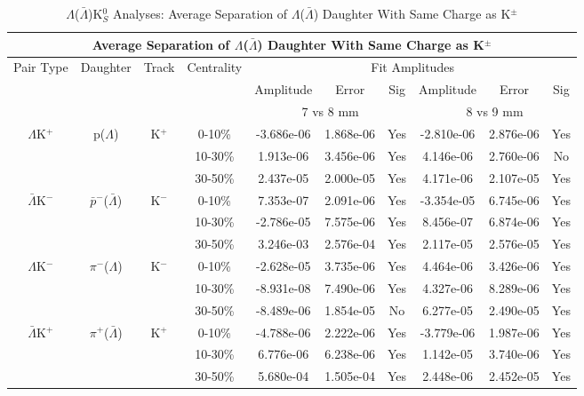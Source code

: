 \documentclass[../AnalysisNoteJBuxton.tex]{subfiles}
\begin{document}
\clearpage



\begin{table}
 \centering
 \begin{tabular}{|c|c|c|c|c|c|c||c|c|c|}
  \multicolumn{10}{c}{Average Separation of $\Lambda$($\bar{\Lambda}$) Daughter With Same Charge as K$^{\pm}$} \\
  \hline
  \multirow{3}{*}{Pair Type} & \multirow{3}{*}{Daughter} & \multirow{3}{*}{Track} & \multirow{3}{*}{Centrality} & \multicolumn{6}{c|}{Fit Amplitudes} \\
  \cline{5-10}
   & & & & Amplitude & Error & Sig & Amplitude & Error & Sig \\  
  \cline{5-10}
   & & & & \multicolumn{3}{c||}{7 vs 8 mm} & \multicolumn{3}{c|}{8 vs 9 mm} \\  
  \hline
  \multirow{3}{*}{$\Lambda$K$^{+}$} & \multirow{3}{*}{p($\Lambda$)} & \multirow{3}{*}{K$^{+}$}
   &      0-10\% & -3.686e-06 & 1.868e-06 & Yes & -2.810e-06 & 2.876e-06 & Yes \\
   & & & 10-30\% & 1.913e-06 & 3.456e-06 & Yes & 4.146e-06 & 2.760e-06 & No \\
   & & & 30-50\% & 2.437e-05 & 2.000e-05 & Yes & 4.171e-06 & 2.107e-05 & Yes \\
  \hline
  \multirow{3}{*}{$\bar{\Lambda}$K$^{-}$} & \multirow{3}{*}{$\bar{p}^{-}$($\bar{\Lambda}$)} & \multirow{3}{*}{K$^{-}$}
   &      0-10\% & 7.353e-07 & 2.091e-06 & Yes & -3.354e-05 & 6.745e-06 & Yes \\
   & & & 10-30\% & -2.786e-05 & 7.575e-06 & Yes & 8.456e-07 & 6.874e-06 & Yes \\
   & & & 30-50\% & 3.246e-03 & 2.576e-04 & Yes & 2.117e-05 & 2.576e-05 & Yes \\
  \hline \hline
  \multirow{3}{*}{$\Lambda$K$^{-}$} & \multirow{3}{*}{$\pi^{-}$($\Lambda$)} & \multirow{3}{*}{K$^{-}$}
   &      0-10\% & -2.628e-05 & 3.735e-06 & Yes & 4.464e-06 & 3.426e-06 & Yes \\
   & & & 10-30\% & -8.931e-08 & 7.490e-06 & Yes & 4.327e-06 & 8.289e-06 & Yes \\
   & & & 30-50\% & -8.489e-06 & 1.854e-05 & No & 6.277e-05 & 2.490e-05 & Yes \\
  \hline
  \multirow{3}{*}{$\bar{\Lambda}$K$^{+}$} & \multirow{3}{*}{$\pi^{+}$($\bar{\Lambda}$)} & \multirow{3}{*}{K$^{+}$}
   &      0-10\% & -4.788e-06 & 2.222e-06 & Yes & -3.779e-06 & 1.987e-06 & Yes \\
   & & & 10-30\% & 6.776e-06 & 6.238e-06 & Yes & 1.142e-05 & 3.740e-06 & Yes \\
   & & & 30-50\% & 5.680e-04 & 1.505e-04 & Yes & 2.448e-06 & 2.452e-05 & Yes \\
  \hline
 \end{tabular}
 \caption{$\Lambda$($\bar{\Lambda}$)K$^{0}_{S}$ Analyses: Average Separation of $\Lambda$($\bar{\Lambda}$) Daughter With Same Charge as K$^{\pm}$}
 \label{tab:AvgSepLamKch}
\end{table}
\end{document}
